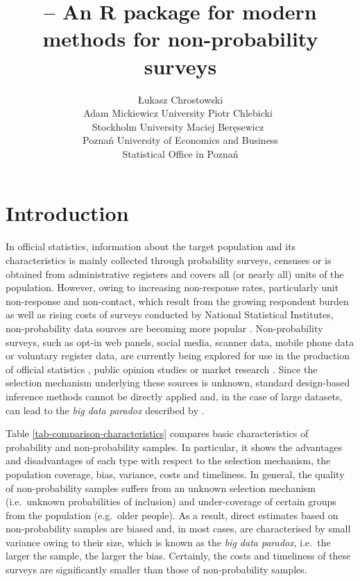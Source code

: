 \documentclass[
]{jss}
\author{
Łukasz Chrostowski\\Adam Mickiewicz University \And Piotr
Chlebicki~\orcidlink{0009-0006-4867-7434}\\Stockholm University
\AND Maciej Beręsewicz~\orcidlink{0000-0002-8281-4301}\\Poznań
University of Economics and Business\\
Statistical Office in Poznań
}
\title{\pkg{nonprobsvy} -- An R package for modern methods for
non-probability surveys}
\begin{document}
\section{Introduction}\label{sec-introduction}

In official statistics, information about the target population and its
characteristics is mainly collected through probability surveys,
censuses or is obtained from administrative registers and covers all (or
nearly all) units of the population. However, owing to increasing
non-response rates, particularly unit non-response and non-contact,
which result from the growing respondent burden as well as rising costs
of surveys conducted by National Statistical Institutes, non-probability
data sources are becoming more popular
\citep{berkesewicz2017two, beaumont2020probability, biffignandi2021handbook}.
Non-probability surveys, such as opt-in web panels, social media,
scanner data, mobile phone data or voluntary register data, are
currently being explored for use in the production of official
statistics \citep{citro2014multiple, daas2015big}, public opinion
studies \citep{Schonlau2017} or market research \citep[cf.][]{Grow2022}.
Since the selection mechanism underlying these sources is unknown,
standard design-based inference methods cannot be directly applied and,
in the case of large datasets, can lead to the \textit{big data paradox}
described by \citet{meng2018statistical}.

Table \ref{tab-comparison-characteristics} compares basic
characteristics of probability and non-probability samples. In
particular, it shows the advantages and disadvantages of each type with
respect to the selection mechanism, the population coverage, bias,
variance, costs and timeliness. In general, the quality of
non-probability samples suffers from an unknown selection mechanism
(i.e.~unknown probabilities of inclusion) and under-coverage of certain
groups from the population (e.g.~older people). As a result, direct
estimates based on non-probability samples are biased and, in most
cases, are characterised by small variance owing to their size, which is
known as the \textit{big data paradox}, i.e.~the larger the sample, the
larger the bias. Certainly, the costs and timeliness of these surveys
are significantly smaller than those of non-probability samples.
\end{document}
